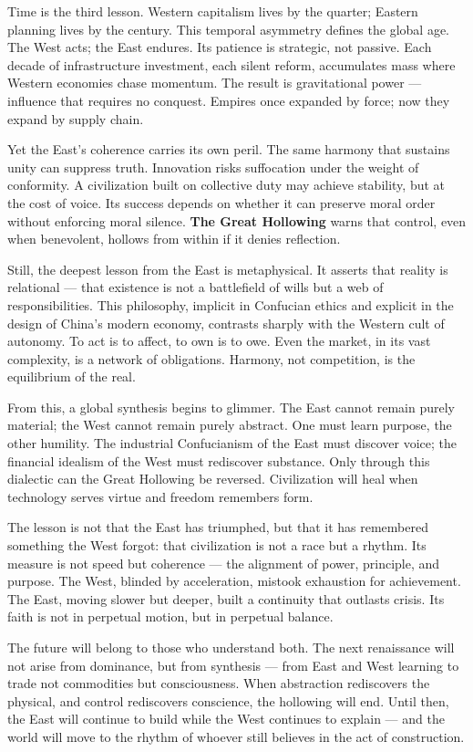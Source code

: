 \documentclass[11pt,twoside]{book}
\begin{document}
Time is the third lesson.  
Western capitalism lives by the quarter; Eastern planning lives by the century.  
This temporal asymmetry defines the global age.  
The West acts; the East endures.  
Its patience is strategic, not passive.  
Each decade of infrastructure investment, each silent reform, accumulates mass where Western economies chase momentum.  
The result is gravitational power — influence that requires no conquest.  
Empires once expanded by force; now they expand by supply chain.

Yet the East’s coherence carries its own peril.  
The same harmony that sustains unity can suppress truth.  
Innovation risks suffocation under the weight of conformity.  
A civilization built on collective duty may achieve stability, but at the cost of voice.  
Its success depends on whether it can preserve moral order without enforcing moral silence.  
\textbf{The Great Hollowing} warns that control, even when benevolent, hollows from within if it denies reflection.

Still, the deepest lesson from the East is metaphysical.  
It asserts that reality is relational — that existence is not a battlefield of wills but a web of responsibilities.  
This philosophy, implicit in Confucian ethics and explicit in the design of China’s modern economy, contrasts sharply with the Western cult of autonomy.  
To act is to affect, to own is to owe.  
Even the market, in its vast complexity, is a network of obligations.  
Harmony, not competition, is the equilibrium of the real.

From this, a global synthesis begins to glimmer.  
The East cannot remain purely material; the West cannot remain purely abstract.  
One must learn purpose, the other humility.  
The industrial Confucianism of the East must discover voice; the financial idealism of the West must rediscover substance.  
Only through this dialectic can the Great Hollowing be reversed.  
Civilization will heal when technology serves virtue and freedom remembers form.

The lesson is not that the East has triumphed, but that it has remembered something the West forgot: that civilization is not a race but a rhythm.  
Its measure is not speed but coherence — the alignment of power, principle, and purpose.  
The West, blinded by acceleration, mistook exhaustion for achievement.  
The East, moving slower but deeper, built a continuity that outlasts crisis.  
Its faith is not in perpetual motion, but in perpetual balance.

The future will belong to those who understand both.  
The next renaissance will not arise from dominance, but from synthesis — from East and West learning to trade not commodities but consciousness.  
When abstraction rediscovers the physical, and control rediscovers conscience, the hollowing will end.  
Until then, the East will continue to build while the West continues to explain — and the world will move to the rhythm of whoever still believes in the act of construction.
\end{document}

